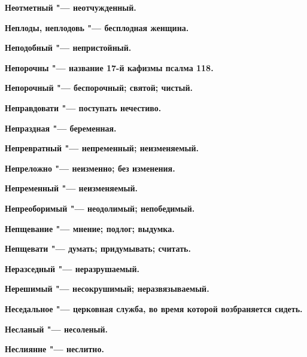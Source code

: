 \bfseries Неотметный \normalfont{} "--- неотчужденный. 




\bfseries Неплоды, неплодовь \normalfont{} "--- бесплодная женщина. 




\bfseries Неподобный \normalfont{} "--- непристойный. 




\bfseries Непорочны \normalfont{} "--- название 17-й кафизмы псалма 118. 




\bfseries Непорочный \normalfont{} "--- беспорочный; святой; чистый. 




\bfseries Неправдовати \normalfont{} "--- поступать нечестиво. 




\bfseries Непраздная \normalfont{} "--- беременная. 




\bfseries Непревратный \normalfont{} "--- непременный; неизменяемый. 




\bfseries Непреложно \normalfont{} "--- неизменно; без изменения. 




\bfseries Непременный \normalfont{} "--- неизменяемый. 




\bfseries Непреоборимый \normalfont{} "--- неодолимый; непобедимый. 




\bfseries Непщевание \normalfont{} "--- мнение; подлог; выдумка. 




\bfseries Непщевати \normalfont{} "--- думать; придумывать; считать. 




\bfseries Неразседный \normalfont{} "--- неразрушаемый. 




\bfseries Нерешимый \normalfont{} "--- несокрушимый; неразвязываемый. 




\bfseries Неседальное \normalfont{} "--- церковная служба, во время которой возбраняется сидеть. 




\bfseries Несланый \normalfont{} "--- несоленый. 




\bfseries Неслиянне \normalfont{} "--- неслитно. 




